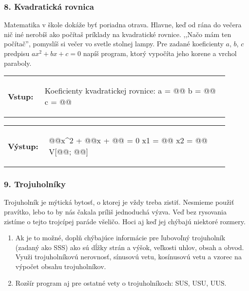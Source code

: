 \subsubsection*{8. Kvadratická rovnica}
Matematika v škole dokáže byť poriadna otrava. Hlavne, keď od rána do večera nič iné nerobíš ako počítaš príklady na kvadratické rovnice. ,,Načo mám ten počítač'', pomyslíš si večer vo svetle stolnej lampy. Pre zadané koeficienty $a$, $b$, $c$ predpisu $ax^2 + bx + c = 0$ napíš program, ktorý vypočíta jeho korene a vrchol paraboly.

\begin{tabular}{@{}p{0.15\linewidth}p{0.75\linewidth}}
\textbf{\small Vstup:} &
\vspace{-3em}
\begin{code}
Koeficienty kvadratickej rovnice:
a = @\fbox{\phantom{vstup}}@
b = @\fbox{\phantom{vstup}}@
c = @\fbox{\phantom{vstup}}@
\end{code}
\end{tabular}

\vspace{-2em}
\begin{tabular}{@{}p{0.15\linewidth}p{0.75\linewidth}}
\textbf{\small Výstup:} &
\vspace{-3em}
\begin{code}
@\fbox{\phantom{a}}@x^2 + @\fbox{\phantom{b}}@x + @\fbox{\phantom{c}}@ = 0
x1 = @\fbox{\phantom{abc}}@
x2 = @\fbox{\phantom{abc}}@
V[@\fbox{\phantom{abc}}@; @\fbox{\phantom{abc}}@]
\end{code}
\end{tabular}
\vspace{-2em}


\subsubsection*{9. Trojuholníky}
Trojuholník je mýtická bytosť, o ktorej je vždy treba zistiť. Nesmieme použiť pravítko, lebo to by nás čakala príliš jednoduchá výzva. Veď bez rysovania zistíme o tejto trojcípej paráde všeličo. Hoci aj keď jej chýbajú niektoré rozmery.

\begin{enumerate}[label=\alph*)]
\item Ak je to možné, doplň chýbajúce informácie pre ľubovoľný trojuholník (zadaný ako SSS) ako sú dĺžky strán a výšok, veľkosti uhlov, obsah a obvod. Využi trojuholníkovú nerovnosť, sínusovú vetu, kosínusovú vetu a vzorec na výpočet obsahu trojuholníkov.
\item Rozšír program aj pre ostatné vety o trojuholníkoch: SUS, USU, UUS.
\end{enumerate}

